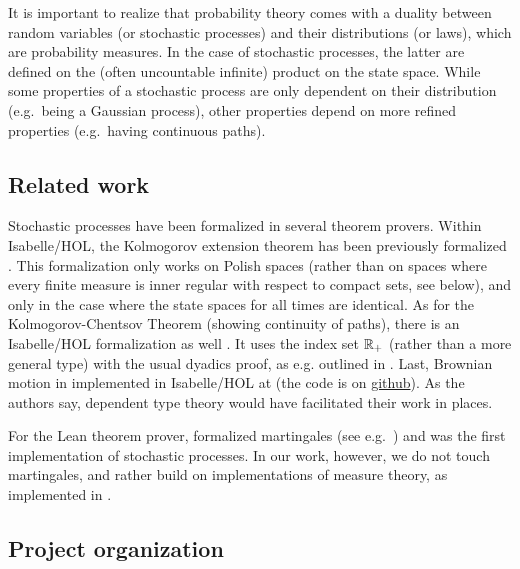 \documentclass[lean]{Draft}
\begin{document}
It is important to realize that probability theory comes with a duality between random variables (or stochastic processes) and their distributions (or laws), which are probability measures. In the case of stochastic processes, the latter are defined on the (often uncountable infinite) product on the state space. While some properties of a stochastic process are only dependent on their distribution (e.g.\ being a Gaussian process), other properties depend on more refined properties (e.g.\ having continuous paths).



\subsection{Related work}
Stochastic processes have been formalized in several theorem provers.
Within Isabelle/HOL, the Kolmogorov extension theorem has been previously formalized \cite{Immler2012}. This formalization only works on Polish spaces (rather than on spaces where every finite measure is inner regular with respect to compact sets, see below), and only in the case where the state spaces for all times are identical. As for the Kolmogorov-Chentsov Theorem (showing continuity of paths), there is an Isabelle/HOL formalization as well \cite{Kolmogorov_Chentsov-AFP}.
It uses the index set  $\mathbb{R}_+$ (rather than a more general type) with the usual dyadics proof, as e.g. outlined in \cite{kallenberg2021}. Last,
Brownian motion in implemented in Isabelle/HOL at \cite{laursen2024brownian} (the code is on \href{https://github.com/cplaursen/Brownian_Motion}{github}). As the authors say, dependent type theory would have facilitated their work in places.

For the Lean theorem prover, \cite{ying2023formalization} formalized martingales (see e.g.\ \cite{kallenberg2021}) and was the first implementation of stochastic processes. In our work, however, we do not touch martingales, and rather build on implementations of measure theory, as implemented in \cite{mathlib}.


\subsection{Project organization}
\end{document}
